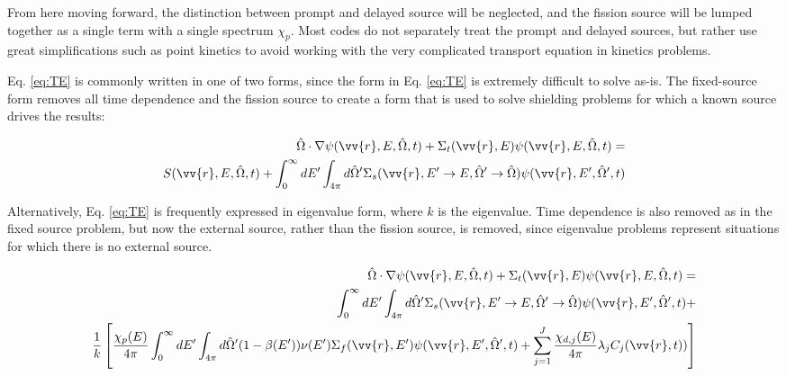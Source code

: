 \documentclass[10pt]{article}
\begin{document}
\begin{flushleft}
From here moving forward, the distinction between prompt and delayed source will be neglected, and the fission source will be lumped together as a single term with a single spectrum \(\chi_p\). Most codes do not separately treat the prompt and delayed sources, but rather use great simplifications such as point kinetics to avoid working with the very complicated transport equation in kinetics problems. 

Eq. \eqref{eq:TE} is commonly written in one of two forms, since the form in Eq. \eqref{eq:TE} is extremely difficult to solve as-is. The fixed-source form removes all time dependence and the fission source to create a form that is used to solve shielding problems for which a known source drives the results:

\begin{equation}
\label{eq:TE_fixedsource}
\begin{aligned}
 \hat{\Omega}\cdot\nabla\psi(\vv{r}, E, \hat{\Omega},t) + 
 \Sigma_t(\vv{r},E)\psi(\vv{r}, E, \hat{\Omega},t) = \\
S(\vv{r}, E, \hat{\Omega},t) + \int_{0}^{\infty}dE' \int_{4\pi}^{ } d\hat{\Omega}' \Sigma_s(\vv{r}, E'\rightarrow E, \hat{\Omega}'\rightarrow\hat{\Omega})\psi(\vv{r}, E', \hat{\Omega}',t)\\
\end{aligned}
\end{equation}

Alternatively, Eq. \eqref{eq:TE} is frequently expressed in eigenvalue form, where \(k\) is the eigenvalue. Time dependence is also removed as in the fixed source problem, but now the external source, rather than the fission source, is removed, since eigenvalue problems represent situations for which there is no external source.

\begin{equation}
\label{eq:TE_eigenvalue}
\begin{aligned}
 \hat{\Omega}\cdot\nabla\psi(\vv{r}, E, \hat{\Omega},t) + 
 \Sigma_t(\vv{r},E)\psi(\vv{r}, E, \hat{\Omega},t) = \\
\int_{0}^{\infty}dE' \int_{4\pi}^{ } d\hat{\Omega}' \Sigma_s(\vv{r}, E'\rightarrow E, \hat{\Omega}'\rightarrow\hat{\Omega})\psi(\vv{r}, E', \hat{\Omega}',t) + \\
 \frac{1}{k}\left\lbrack\frac{\chi_p(E)}{4\pi} \int_{0}^{\infty} dE'\int_{4\pi}^{} d\hat{\Omega}'(1-\beta(E'))\nu(E')\Sigma_f(\vv{r}, E')\psi(\vv{r}, E', \hat{\Omega}',t) + 
 \sum_{j = 1}^{J} \frac{\chi_{d,j}(E)}{4\pi} \lambda_j C_j(\vv{r}, t))\right\rbrack
\end{aligned}
\end{equation}


\end{flushleft}
\end{document}
